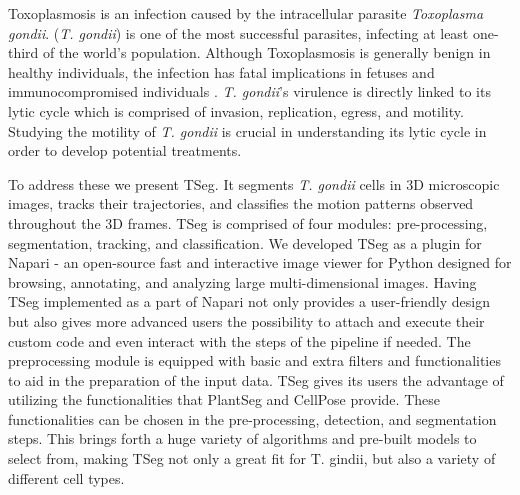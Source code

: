 \documentclass[./dissertation.tex]{subfiles}
\begin{document}
Toxoplasmosis is an infection caused by the intracellular parasite \textit{Toxoplasma gondii}. (\textit{T. gondii}) is one of the most successful parasites, infecting at least one-third of the world's population. Although Toxoplasmosis is generally benign in healthy individuals, the infection has fatal implications in fetuses and immunocompromised individuals \cite{saadatnia2012review}. \textit{T. gondii}'s virulence is directly linked to its lytic cycle which is comprised of invasion, replication, egress, and motility. Studying the motility of \textit{T. gondii} is crucial in understanding its lytic cycle in order to develop potential treatments.

To address these we present TSeg. It segments \textit{T. gondii} cells in 3D microscopic images, tracks their trajectories, and classifies the motion patterns observed throughout the 3D frames. TSeg is comprised of four modules: pre-processing, segmentation, tracking, and classification. We developed TSeg as a plugin for Napari \cite{sofroniew_nicholas_2022_6598542} - an open-source fast and interactive image viewer for Python designed for browsing, annotating, and analyzing large multi-dimensional images. Having TSeg implemented as a part of Napari not only provides a user-friendly design but also gives more advanced users the possibility to attach and execute their custom code and even interact with the steps of the pipeline if needed. The preprocessing module is equipped with basic and extra filters and functionalities to aid in the preparation of the input data. TSeg gives its users the advantage of utilizing the functionalities that PlantSeg and CellPose provide. These functionalities can be chosen in the pre-processing, detection, and segmentation steps. This brings forth a huge variety of algorithms and pre-built models to select from, making TSeg not only a great fit for T. gindii, but also a variety of different cell types.

\end{document}
